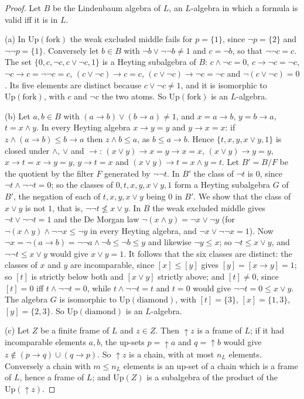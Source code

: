 \documentclass[11pt]{amsart}
\theoremstyle{definition}
\newcommand{\Up}{\mathrm{Up}}
\begin{document}
\begin{proof}
Let $B$ be the Lindenbaum algebra of $L$, an $L$-algebra in which a
formula is valid iff it is in $L$.

(a) In $\Up(\text{fork})$ the weak excluded middle fails for
$p=\{1\}$, since $\neg p=\{2\}$ and $\neg\neg p=\{1\}$. Conversely let
$b\in B$ with $\neg b\vee\neg\neg b\ne1$ and $c=\neg b$, so that
$\neg\neg c=c$. The set $\{0,c,\neg c,c\vee\neg c,1\}$ is a Heyting
subalgebra of $B$: $c\wedge\neg c=0$, $c\to\neg c=\neg c$, $\neg c\to
c=\neg\neg c=c$, $(c\vee\neg c)\to c=c$, $(c\vee\neg c)\to\neg c=\neg
c$ and $\neg(c\vee\neg c)=0$. Its five elements are distinct because
$c\vee\neg c\ne1$, and it is isomorphic to $\Up(\text{fork})$, with $c$
and $\neg c$ the two atoms. So $\Up(\text{fork})$ is an $L$-algebra.

(b) Let $a,b\in B$ with $(a\to b)\vee(b\to a)\ne1$, and $x=a\to b$,
$y=b\to a$, $t=x\wedge y$. In every Heyting algebra $x\to y=y$ and
$y\to x=x$: if $z\wedge(a\to b)\le b\to a$ then $z\wedge b\le a$, as
$b\le a\to b$. Hence $\{t,x,y,x\vee y,1\}$ is closed under $\wedge$,
$\vee$ and $\to$: $(x\vee y)\to x=y\to x=x$, $(x\vee y)\to y=y$,
$x\to t=x\to y=y$, $y\to t=x$ and $(x\vee y)\to t=x\wedge y=t$. Let $B'=B/F$ be the quotient by the
filter $F$ generated by $\neg\neg t$. In $B'$ the class of $\neg t$ is
$0$, since $\neg t\wedge\neg\neg t=0$; so the classes of
$0,t,x,y,x\vee y,1$ form a Heyting subalgebra $G$ of $B'$, the
negation of each of $t,x,y,x\vee y$ being $0$ in $B'$. We show that
the class of $x\vee y$ is not $1$, that is, $\neg\neg t\not\le x\vee
y$. In $B$ the weak excluded middle gives $\neg t\vee\neg\neg t=1$ and
the De Morgan law $\neg(x\wedge y)=\neg x\vee\neg y$ (for $\neg(x\wedge
y)\wedge\neg\neg x\le\neg y$ in every Heyting algebra, and $\neg
x\vee\neg\neg x=1$). Now $\neg x=\neg(a\to b)=\neg\neg a\wedge\neg
b\le\neg b\le y$ and likewise $\neg y\le x$; so $\neg t\le x\vee y$,
and $\neg\neg t\le x\vee y$ would give $x\vee y=1$. It follows that
the six classes are distinct: the classes of $x$ and $y$ are
incomparable, since $[x]\le[y]$ gives $[y]=[x\to y]=1$; so $[t]$ is
strictly below both and $[x\vee y]$ strictly above; and $[t]\ne0$,
since $[t]=0$ iff $t\wedge\neg\neg t=0$, while $t\wedge\neg\neg t=t$ and $t=0$ would give $\neg\neg t=0\le
x\vee y$. The algebra $G$ is isomorphic to $\Up(\text{diamond})$, with
$[t]=\{3\}$, $[x]=\{1,3\}$, $[y]=\{2,3\}$. So $\Up(\text{diamond})$ is
an $L$-algebra.

(c) Let $Z$ be a finite frame of $L$ and $z\in Z$. Then $\uparrow\!z$
is a frame of $L$; if it had incomparable elements $a,b$, the up-sets
$p=\uparrow\!a$ and $q=\uparrow\!b$ would give $z\notin(p\to
q)\cup(q\to p)$. So $\uparrow\!z$ is a chain, with at most $n_L$
elements. Conversely a chain with $m\le n_L$ elements is an up-set of
a chain which is a frame of $L$, hence a frame of $L$; and $\Up(Z)$ is
a subalgebra of the product of the $\Up(\uparrow\!z)$.
\end{proof}
\end{document}
